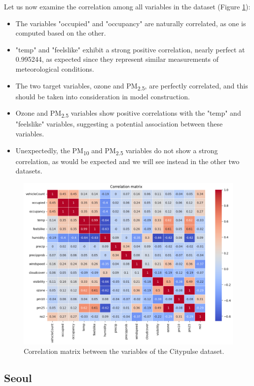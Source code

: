 Let us now examine the correlation among all variables in the dataset (Figure \ref{fig:corr_matrix_citypulse}):
\begin{itemize}

    \item The variables "occupied" and "occupancy" are naturally correlated, as one is computed based on the other.
    \item "temp" and "feelslike" exhibit a strong positive correlation, nearly perfect at 0.995244, as expected since they represent similar measurements of meteorological conditions.
    \item The two target variables, ozone and PM\textsubscript{2.5}, are perfectly correlated, and this should be taken into consideration in model construction.
    \item Ozone and PM\textsubscript{2.5} variables show positive correlations with the "temp" and "feelslike" variables, suggesting a potential association between these variables.
    \item Unexpectedly, the PM\textsubscript{10} and PM\textsubscript{2.5} variables do not show a strong correlation, as would be expected and we will see instead in the other two datasets.
\end{itemize}

\begin{figure}[h]
    \centering
    \includegraphics[width=0.75\linewidth]{images/corr_matrix_citypulse.png}
    \caption{Correlation matrix between the variables of the Citypulse dataset.}
    \label{fig:corr_matrix_citypulse}
\end{figure}

\newpage
\subsection{Seoul}

